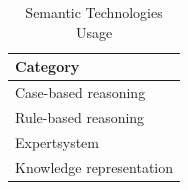         
            \begin{table}[h]
                \centering
        	    {
        	    \begin{tabular}{ | m{14.5cm} | }
                    \hline
                    \rowcolor{teal!30} \textbf{Category} \\
                    
                    \hline
                    Case-based reasoning\\
                    
                    \hline
                    Rule-based reasoning\\
                    
                    \hline
                    Expertsystem\\
                    
                    \hline
                    Knowledge representation\\
                    
                    \hline
                \end{tabular}}
                \caption{\label{tab:sem-tec-usage} Semantic Technologies Usage}
            \end{table}

